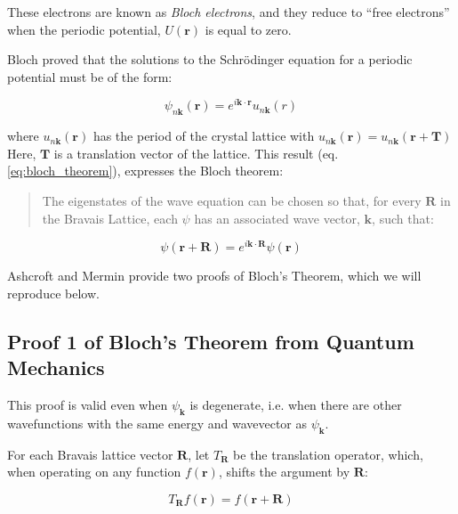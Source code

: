 These electrons are known as \textit{Bloch electrons}, and they reduce to ``free electrons'' when the periodic potential, $U(\boldsymbol{r})$ is equal to zero.

Bloch proved that the solutions to the Schrödinger equation for a periodic potential must be of the form:

\begin{equation} \label{eq:bloch_theorem}
\psi_{n\boldsymbol{k}}(\boldsymbol{r}) 
= e^{i\boldsymbol{k} \cdot \boldsymbol{r}}
u_{n\boldsymbol{k}}(r)
\end{equation}

where $u_{n\boldsymbol{k}}(\boldsymbol{r})$ has the period of the crystal lattice with $u_{n\boldsymbol{k}}(\boldsymbol{r}) = u_{n\boldsymbol{k}}(\boldsymbol{r} + \boldsymbol{T})$ 
Here, $\boldsymbol{T}$ is a translation vector of the lattice. This result (eq. \ref{eq:bloch_theorem}), expresses the Bloch theorem:
\begin{quotation}
The eigenstates of the wave equation can be chosen so that, for every $\boldsymbol{R}$ in the Bravais Lattice, each $\psi$ has an associated wave vector, $\boldsymbol{k}$, such that:
\end{quotation}

\begin{equation} \label{eq:bloch_theorem_restate}
\psi(\boldsymbol{r} + \boldsymbol{R})
= e^{i\boldsymbol{k} \cdot \boldsymbol{R}}
\psi(\boldsymbol{r})
\end{equation}


Ashcroft and Mermin provide two proofs of Bloch's Theorem, which we will reproduce below.

\subsection{Proof 1 of Bloch's Theorem from Quantum Mechanics}
This proof is valid even when $\psi_{\boldsymbol{k}}$ is degenerate, i.e. when there are other wavefunctions with the same energy and wavevector as $\psi_{\boldsymbol{k}}$.

For each Bravais lattice vector $\boldsymbol{R}$, let $T_{\boldsymbol{R}}$ be the translation operator, which, when operating on any function $f(\boldsymbol{r})$, shifts the argument by $\boldsymbol{R}$:

\begin{equation} \label{eq:translation}
T_{\boldsymbol{R}} f(\boldsymbol{r})
= f(\boldsymbol{r} + \boldsymbol{R})
\end{equation}

